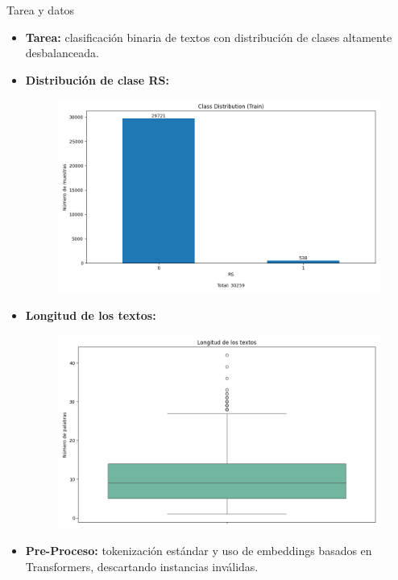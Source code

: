 \documentclass[final]{beamer}
\newlength{\onecolwid}
\begin{document}
\begin{frame}[t]
\begin{columns}[t]
\begin{column}{\onecolwid}

\begin{block}{Tarea y datos}
\begin{itemize}
\item \textbf{Tarea:} clasificación binaria de textos con distribución de clases altamente desbalanceada.
\item \textbf{Distribución de clase RS:}
\begin{figure}
    \centering
    \includegraphics[width=0.9\linewidth]{class_distribution.png}
    \label{fig:class-distribution}
\end{figure}
\item \textbf{Longitud de los textos:}
\begin{figure}
    \centering
    \includegraphics[width=0.9\linewidth]{doc_length_boxplot.png}
    \label{fig:class-length}
\end{figure}
\item \textbf{Pre-Proceso:} tokenización estándar y uso de embeddings basados en Transformers, descartando instancias inválidas.
\end{itemize}


\end{block}
\end{column}
\end{columns}
\end{frame}
\end{document}
